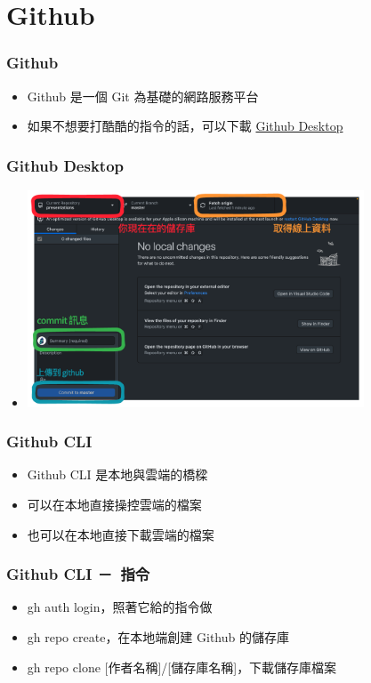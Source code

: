 \documentclass[mathserif]{beamer}
\begin{document}
\section{Github}

\begin{frame}
    \frametitle{Github}
    \begin{itemize}
        \item Github 是一個 Git 為基礎的網路服務平台
        \item<2-> 如果不想要打酷酷的指令的話，可以下載 \href{https://desktop.github.com/}{Github Desktop}
    \end{itemize}
\end{frame}

\begin{frame}
    \frametitle{Github Desktop}
    \begin{itemize}
        \item \includegraphics[width=10.0cm]{img/desktop.png}
    \end{itemize}
\end{frame}

\begin{frame}
    \frametitle{Github CLI}
    \begin{itemize}
        \item Github CLI 是本地與雲端的橋樑
        \item 可以在本地直接操控雲端的檔案
        \item 也可以在本地直接下載雲端的檔案
    \end{itemize}
\end{frame}

\begin{frame}
    \frametitle{Github CLI －\ 指令}
    \begin{itemize}
        \item {\color{red}gh auth login}，照著它給的指令做
        \item<2-> {\color{red}gh repo create}，在本地端創建 Github 的儲存庫
        \item<3-> {\color{red}gh repo clone [作者名稱]/[儲存庫名稱]}，下載儲存庫檔案
    \end{itemize}
\end{frame}
\end{document}
